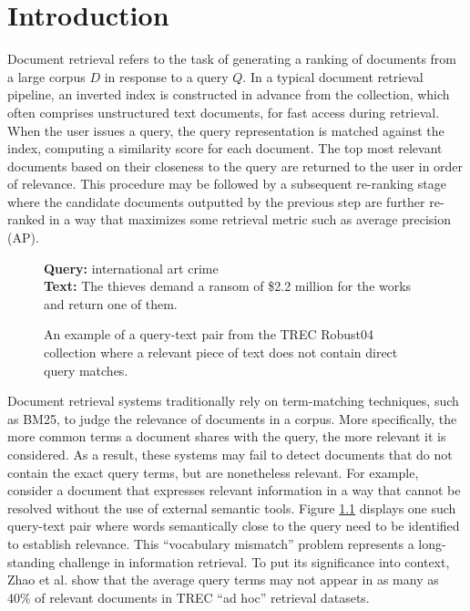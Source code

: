 \chapter{Introduction}

Document retrieval refers to the task of generating a ranking of documents from a large corpus $ D $ in response to a query $ Q $.
In a typical document retrieval pipeline, an inverted index is constructed in advance from the collection, which often comprises unstructured text documents, for fast access during retrieval.
When the user issues a query, the query representation is matched against the index, computing a similarity score for each document.
The top most relevant documents based on their closeness to the query are returned to the user in order of relevance.
This procedure may be followed by a subsequent re-ranking stage where the candidate documents outputted by the previous step are further re-ranked in a way that maximizes some retrieval metric such as average precision (AP).

\begin{figure}[b!]
	\begin{framed}
		\centering
    		\textbf{Query:} international art crime \\
    		\textbf{Text:} The thieves demand a ransom of \$2.2 million for the works and return one of them.
	\end{framed}
\label{query-sent-example}
 \caption{An example of a query-text pair from the TREC Robust04 collection where a relevant piece of text does not contain direct query matches.}
\end{figure}

Document retrieval systems traditionally rely on term-matching techniques, such as BM25, to judge the relevance of documents in a corpus.
More specifically, the more common terms a document shares with the query, the more relevant it is considered.
As a result, these systems may fail to detect documents that do not contain the exact query terms, but are nonetheless relevant.
For example, consider a document that expresses relevant information in a way that cannot be resolved without the use of external semantic tools.
Figure \ref{query-sent-example} displays one such query-text pair where words semantically close to the query need to be identified to establish relevance.
This ``vocabulary mismatch'' problem represents a long-standing challenge in information retrieval.
To put its significance into context, Zhao et al. \cite{zhao2010term} show that the average query terms may not appear in as many as 40\% of relevant documents in TREC ``ad hoc'' retrieval datasets.

